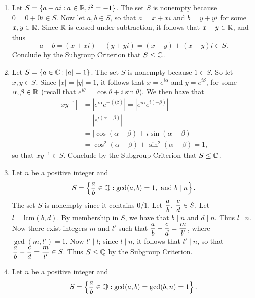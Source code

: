 \begin{enumerate}
      \begin{enumerate}
         \item Let $S = \{a + ai: a \in \mathbb{R}, i^2 = -1\}$. The set $S$ is nonempty
               because $0 = 0 + 0i \in S$. Now let $a, b \in S$, so that
               $a = x + xi$ and $b = y + yi$ for some $x, y \in \mathbb{R}$. Since $\mathbb{R}$
               is closed under subtraction, it follows that $x - y \in \mathbb{R}$, and
               thus
               $$a - b = (x + xi) - (y + yi) = (x - y) + (x - y)i \in S.$$
               Conclude by the Subgroup Criterion that $S \le \mathbb{C}$.
         \item Let $S = \{a \in \mathbb{C}: |a| = 1\}$. The set $S$ is nonempty because
               $1 \in S$. So let $x, y \in S$. Since $|x| = |y| = 1$, it
               follows that $x = e^{i\alpha}$ and  $y = e^{i\beta}$, for some
               $\alpha, \beta \in \mathbb{R}$ (recall that $e^{i\theta} = \cos\theta +
               i\sin\theta$). We then have that
               \begin{align*}
                  |xy^{-1}| &= |e^{i\alpha}e^{-(i\beta)}| =
                  |e^{i\alpha}e^{i(-\beta)}| \\
                  &= |e^{i(\alpha-\beta)}| \\
                  &= |\cos(\alpha-\beta) + i\sin(\alpha-\beta)| \\
                  &= \cos^2(\alpha-\beta) + \sin^2(\alpha-\beta) = 1,
               \end{align*}
               so that $xy^{-1} \in S$. 
               Conclude by the Subgroup Criterion that $S \le \mathbb{C}$.
         \item Let $n$ be a positive integer and
               $$S = \left\{\frac{a}{b} \in
               \mathbb{Q} : \gcd(a, b) = 1, \text{ and } b \mid n\right\}.$$ 
               The set $S$ is nonempty since it contains 0/1. Let
               $\displaystyle\frac{a}{b}$, $\displaystyle\frac{c}{d} \in S$. Let
               $l = \mbox{lcm}(b, d)$. By membership in $S$, we have that
               $b \mid n$ and $d \mid n$. Thus $l \mid n$. Now there exist
               integers $m$ and $l'$ such that
               $\displaystyle\frac{a}{b} - \frac{c}{d} = \frac{m}{l'}$, where
               $\gcd(m, l') = 1$. Now $l' \mid l$; since $l \mid n$, it follows 
               that $l' \mid n$, so that
               $\displaystyle\frac{a}{b} - \frac{c}{d} = \frac{m}{l'} \in S$. Thus
               $S \le \mathbb{Q}$ by the Subgroup Criterion.
         \item Let $n$ be a positive integer and
               $$S = \left\{\frac{a}{b} \in \mathbb{Q}:\gcd(a, b)=\gcd(b,n)=1\right\}.$$ 

\end{enumerate}
\end{enumerate}

